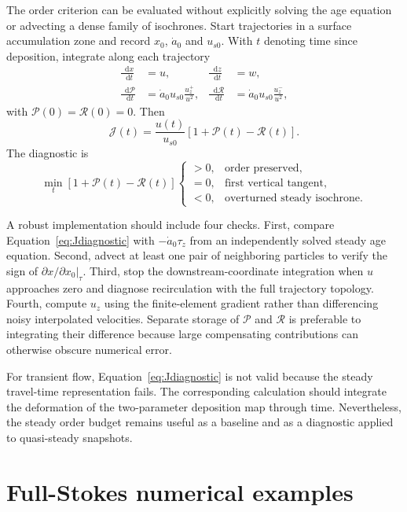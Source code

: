 \documentclass[review]{igs}
\theoremstyle{definition}
\theoremstyle{remark}
\newcommand{\dd}{\mathop{}\!\mathrm{d}}
\newcommand{\Rpos}{\mathcal{P}}
\newcommand{\Rneg}{\mathcal{R}}
\newcommand{\Jord}{\mathcal{J}}
\begin{document}
The order criterion can be evaluated without explicitly solving the age equation or advecting a dense family of isochrones. Start trajectories in a surface accumulation zone and record \(x_0\), \(\dot a_0\) and \(u_{s0}\). With \(t\) denoting time since deposition, integrate along each trajectory
\begin{align}
\frac{\dd x}{\dd t}&=u,
&
\frac{\dd z}{\dd t}&=w,
\label{eq:trajectory}\\
\frac{\dd\Rpos}{\dd t}
&=\dot a_0u_{s0}\frac{u_z^+}{u^2},
&
\frac{\dd\Rneg}{\dd t}
&=\dot a_0u_{s0}\frac{u_z^-}{u^2},
\label{eq:PRode}
\end{align}
with \(\Rpos(0)=\Rneg(0)=0\). Then
\begin{equation}
\boxed{
\Jord(t)=\frac{u(t)}{u_{s0}}
\left[1+\Rpos(t)-\Rneg(t)\right].
}
\label{eq:Jdiagnostic}
\end{equation}
The diagnostic is
\begin{equation}
\min_t\left[1+\Rpos(t)-\Rneg(t)\right]
\begin{cases}
>0, & \text{order preserved},\\
=0, & \text{first vertical tangent},\\
<0, & \text{overturned steady isochrone}.
\end{cases}
\label{eq:numericaltest}
\end{equation}

A robust implementation should include four checks. First, compare Equation~\eqref{eq:Jdiagnostic} with \(-\dot a_0\tau_z\) from an independently solved steady age equation. Second, advect at least one pair of neighboring particles to verify the sign of \(\partial x/\partial x_0|_{\tau}\). Third, stop the downstream-coordinate integration when \(u\) approaches zero and diagnose recirculation with the full trajectory topology. Fourth, compute \(u_z\) using the finite-element gradient rather than differencing noisy interpolated velocities. Separate storage of \(\Rpos\) and \(\Rneg\) is preferable to integrating their difference because large compensating contributions can otherwise obscure numerical error.

For transient flow, Equation~\eqref{eq:Jdiagnostic} is not valid because the steady travel-time representation fails. The corresponding calculation should integrate the deformation of the two-parameter deposition map through time. Nevertheless, the steady order budget remains useful as a baseline and as a diagnostic applied to quasi-steady snapshots.

\section{Full-Stokes numerical examples}
\label{sec:numericalexamples}
\end{document}
